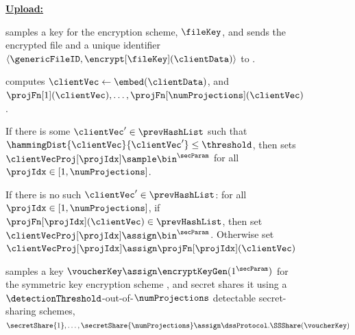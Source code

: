 \begin{figure}
{\begin{minipage}[t]{\textwidth}
\enumListEnd

\medskip\noindent\textbf{\underline{Upload:}} 


\enumListStartResume
\item \client samples a key for the encryption scheme, $\fileKey$, and sends the encrypted file and a unique identifier $\langle \genericFileID, \encrypt[\fileKey](\clientData) \rangle$ to \server.

\item \client computes $\clientVec \gets \embed(\clientData)$, and $\projFn[1](\clientVec), \dots, \projFn[\numProjections](\clientVec)$.

\enumListStart
\item  If there is some $\clientVec' \in \prevHashList$ such that $\hammingDist{\clientVec}{\clientVec'} \le \threshold$, then \client sets $\clientVecProj[\projIdx] \sample \bin^{\secParam}$ for all $\projIdx \in [1, \numProjections]$.   
\item If there is no such $\clientVec' \in \prevHashList$: for all $\projIdx \in [1, \numProjections]$, if $\projFn[\projIdx](\clientVec) \in \prevHashList$, then set $\clientVecProj[\projIdx] \assign \bin^{\secParam}$. Otherwise set $\clientVecProj[\projIdx] \assign \projFn[\projIdx](\clientVec)$
\enumListEnd



%

\item \client samples a key $\voucherKey \assign \encryptKeyGen(1^\secParam)$ for the symmetric key encryption scheme \encryptionSchemeDefn, and secret shares it using a 
$\detectionThreshold$-out-of-$\numProjections$ detectable secret-sharing schemes, 
$\secretShare{1}, \dots, \secretShare{\numProjections} \assign \dssProtocol.\SSShare(\voucherKey)$


\end{minipage}}
\end{figure}
